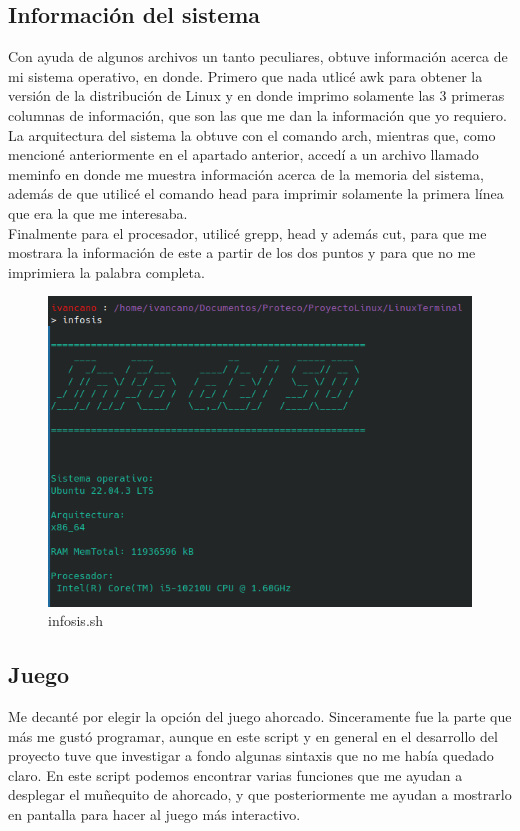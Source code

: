 \documentclass[letter,11pt]{article}
\begin{document}
\subsection{Información del sistema}
Con ayuda de algunos archivos un tanto peculiares, obtuve información acerca de mi sistema operativo, en donde. Primero que nada utlicé awk para obtener la versión de la distribución de Linux y en donde imprimo solamente las 3 primeras columnas de información, que son las que me dan la información que yo requiero.\\
La arquitectura del sistema la obtuve con el comando arch, mientras que, como mencioné anteriormente en el apartado anterior, accedí a un archivo llamado meminfo en donde me muestra información acerca de la memoria del sistema, además de que utilicé el comando head para imprimir solamente la primera línea que era la que me interesaba. \\
Finalmente para el procesador, utilicé grepp, head y además cut, para que me mostrara la información de este a partir de los dos puntos y para que no me imprimiera la palabra completa.

\begin{figure} [H]
    \centering 
    \caption{infosis.sh}
    \includegraphics[scale=.5]{infosis.png} 
\end{figure}

\subsection{Juego}

Me decanté por elegir la opción del juego ahorcado. Sinceramente fue la parte que más me gustó programar, aunque en este script y en general en el desarrollo del proyecto tuve que investigar a fondo algunas sintaxis que no me había quedado claro. En este script podemos encontrar varias funciones que me ayudan a desplegar el muñequito de ahorcado, y que posteriormente me ayudan a mostrarlo en pantalla para hacer al juego más interactivo. \\
\end{document}
